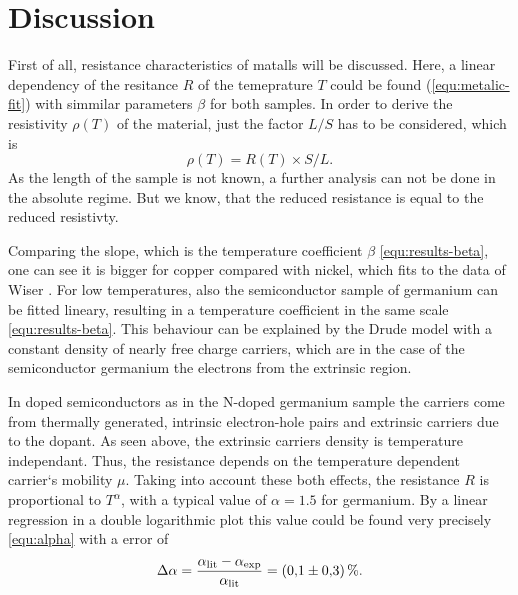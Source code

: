 \section{Discussion}
\label{sec:Discussion}


First of all, resistance characteristics of matalls will be discussed.
Here, a linear dependency of the resitance $R$ of the temeprature $T$ could be found (\ref{equ:metalic-fit}) with simmilar parameters $\beta$ for both samples.
In order to derive the resistivity $\rho(T)$ of the material, just the factor $L/S$ has to be considered,
which is 
\begin{equation}
    \rho(T) = R(T) \times S/L.
\end{equation}
As the length of the sample is not known, a further analysis can not be done in the absolute regime.
But we know, that the reduced resistance is equal to the reduced resistivty.

Comparing the slope, which is the temperature coefficient $\beta$ \ref{equ:results-beta}, one can see it is bigger for copper compared with nickel, which fits to the data of Wiser \cite{resistivity}.
For low temperatures, also the semiconductor sample of germanium can be fitted lineary, resulting in a temperature coefficient in the same scale \ref{equ:results-beta}.
This behaviour can be explained by the Drude model with a constant density of nearly free charge carriers, which are in the case of the semiconductor germanium the electrons from the extrinsic region.

In doped semiconductors as in the N-doped germanium sample the carriers come from thermally generated, intrinsic electron-hole pairs and extrinsic carriers due to the dopant.
As seen above, the extrinsic carriers density is temperature independant.
Thus, the resistance depends on the temperature dependent carrier`s mobility $\mu$.
Taking into account these both effects, the resistance $R$ is proportional to $T^\alpha$, with a typical value of $\alpha = 1.5$ for germanium.
By a linear regression in a double logarithmic plot this value could be found very precisely \ref{equ:alpha} with a error of
\begin{equation}
    \Delta \alpha = \frac{\alpha_\text{lit}-\alpha_\text{exp}}{\alpha_\text{lit}} = \SI{0.1 \pm 0.3}{\percent}.
\end{equation}

